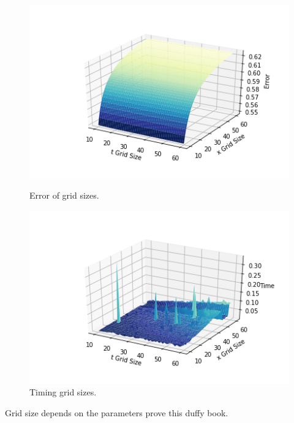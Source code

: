 \documentclass[12pt, oneside]{book}
\theoremstyle{plain}
\theoremstyle{definition}
\begin{document}
\begin{figure}[!htb]
  \begin{minipage}[b]{0.5\textwidth}
    \includegraphics[width=\textwidth]{HeatExplicitGridError.png}
    \caption{Error of grid sizes.}
  \end{minipage}
  \begin{minipage}[b]{0.5\textwidth}
    \includegraphics[width=\textwidth]{HeatExplicitGridTimer.png}
    \caption{Timing grid sizes.}
  \end{minipage}
\end{figure}



Grid size depends on the parameters prove this duffy book.
\end{document}
